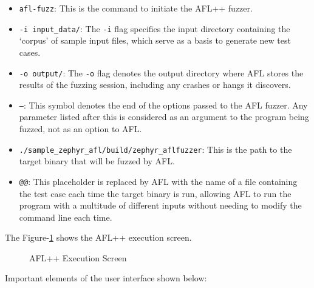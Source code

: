 \begin{itemize}
    \item \texttt{afl-fuzz}: This is the command to initiate the AFL++ fuzzer.
    \item \texttt{-i input\_data/}: The \texttt{-i} flag specifies the
    input directory containing the `corpus' of sample input files,
    which serve as a basis to generate new test cases.
    \item \texttt{-o output/}: The \texttt{-o} flag denotes the output
    directory where AFL stores the results of the fuzzing session,
    including any crashes or hangs it discovers.
    \item \texttt{--}: This symbol denotes the end of the options passed
    to the AFL fuzzer. Any parameter listed after this is considered as
    an argument to the program being fuzzed, not as an option to AFL.
    \item \texttt{./sample\_zephyr\_afl/build/zephyr\_aflfuzzer}: This is the
    path to the target binary that will be fuzzed by AFL.
    \item \texttt{@@}: This placeholder is replaced by AFL with the name of a
    file containing the test case each time the target binary is run,
    allowing AFL to run the program with a multitude of different inputs
    without needing to modify the command line each time.
\end{itemize}

The Figure-\ref{fig:afl_execute_1} shows the AFL++ execution screen.
\begin{figure}[H]
        \caption{AFL++ Execution Screen}\label{fig:afl_execute_1}
\end{figure}

Important elements of the user interface shown below\cite{257204}:

